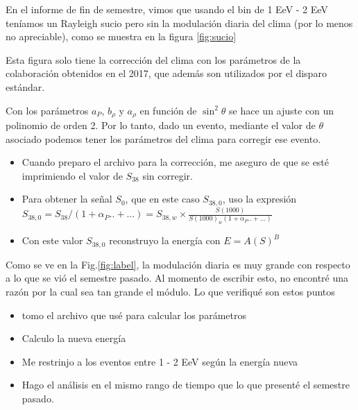 En el informe de fin  de semestre, vimos que usando el bin  de 1 EeV - 2 EeV teníamos un Rayleigh sucio pero sin  la modulación diaria del clima (por lo menos no apreciable), como se muestra en la figura \ref{fig:sucio}



Esta figura solo tiene la corrección del clima con los parámetros de la colaboración obtenidos en el 2017, que además son utilizados por el disparo estándar.

Con los parámetros $a_P$, $b_\rho$ y $a_\rho$ en función de $\sin^2 \theta$ se hace un ajuste con un polinomio de orden 2. Por lo tanto, dado un evento, mediante el  valor de $\theta$ asociado podemos tener los parámetros del clima para corregir ese evento.



\begin{itemize}
\item Cuando preparo el archivo para la corrección, me aseguro de que se esté imprimiendo el valor de $S_{38}$ sin corregir.

\item Para obtener la señal $S_0$, que en este caso $S_{38,0}$, uso la expresión $S_{38,0} = S_{38}/(1 + \alpha_P..+ ...) = S_{38,w}\times \frac{S(1000)}{S(1000)_w (1 + \alpha_P..+ ...)  }$  

\item Con este valor $S_{38,0}$ reconstruyo la energía con $E=A (S)^B$

\end{itemize}



Como se ve en la Fig.\ref{fig:label}, la modulación diaria es muy grande con respecto a  lo que se vió el semestre pasado. Al momento de escribir esto, no encontré una razón por la cual sea tan grande el módulo. Lo que verifiqué son estos puntos

\begin{itemize}
	\item tomo el archivo que usé para calcular los parámetros
	\item Calculo la nueva energía
	\item Me restrinjo a los eventos entre 1 - 2 EeV según la energía nueva
	\item Hago el análisis en el mismo rango de tiempo que lo que presenté el semestre pasado.
\end{itemize}

